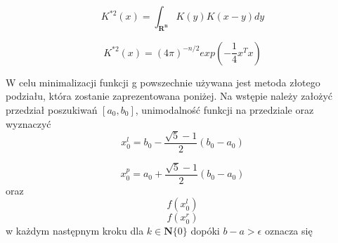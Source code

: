 \begin{equation}
K^{*2}(x) = \int_{\mathbf{R^n}}K(y)K(x-y)dy
\end{equation}

\begin{equation}
K^{*2}(x) = (4\pi)^{-n/2} exp(-\frac{1}{4}x^Tx)
\end{equation}

W celu minimalizacji funkcji g powszechnie używana jest metoda złotego podziału, która zostanie zaprezentowana poniżej. Na wstępie należy założyć przedział poszukiwań $[a_0, b_0]$, unimodalność funkcji na przedziale oraz wyznaczyć
\begin{equation}
x^l_{0} = b_0 - \frac{\sqrt{5} - 1}{2}(b_0 - a_0)
\end{equation}

\begin{equation}
x^p_{0} = a_0 + \frac{\sqrt{5} - 1}{2}(b_0 - a_0)
\end{equation}
oraz 
\begin{equation}
f(x^l_{0})
\end{equation}
\begin{equation}
f(x^r_{0})
\end{equation}
w każdym następnym kroku dla $k \in \mathbf{N}\{0\}$ dopóki $b-a > \epsilon$ oznacza się
